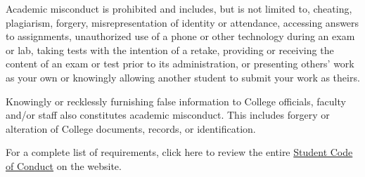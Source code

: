 Academic misconduct is prohibited and includes,
but is not limited to, cheating, plagiarism, forgery,
misrepresentation of identity or attendance, accessing
answers to assignments, unauthorized use of a phone or
other technology during an exam or lab, taking tests
with the intention of a retake, providing or receiving
the content of an exam or test prior to its administration,
or presenting others’ work as your own or knowingly allowing
another student to submit your work as theirs.
\par
\bigskip
Knowingly or recklessly furnishing false information to College
officials, faculty and/or staff also constitutes academic misconduct.
This includes forgery or alteration of College documents, records, or
identification.
\par
\bigskip
For a complete list of requirements, click here to review
the entire
\href{https://dixietech.edu/wp-content/uploads/files/policies/student-code-of-conduct.pdf}{Student Code of Conduct}
on the website.
